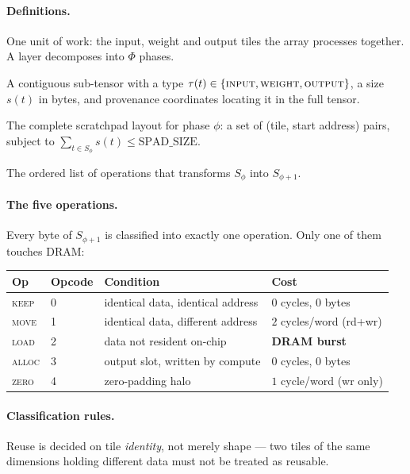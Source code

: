\documentclass[11pt,a4paper]{article}
\newcommand{\op}[1]{\textsc{#1}}
\begin{document}
\paragraph{Definitions.}
\begin{description}[leftmargin=1.8em,style=nextline,itemsep=3pt]
  \item[Phase $\phi$] One unit of work: the input, weight and output tiles the
        array processes together. A layer decomposes into $\Phi$ phases.
  \item[Tile $t$] A contiguous sub-tensor with a type
        $\tau(t) \in \{\textsc{input},\textsc{weight},\textsc{output}\}$, a
        size $s(t)$ in bytes, and provenance coordinates locating it in the
        full tensor.
  \item[Stamp $S_\phi$] The complete scratchpad layout for phase $\phi$: a set
        of (tile, start address) pairs, subject to
        $\sum_{t \in S_\phi} s(t) \le \text{SPAD\_SIZE}$.
  \item[Delta $\Delta_{\phi \to \phi+1}$] The ordered list of operations that
        transforms $S_\phi$ into $S_{\phi+1}$.
\end{description}

\paragraph{The five operations.} Every byte of $S_{\phi+1}$ is classified into
exactly one operation. Only one of them touches DRAM:

\begin{center}
\small
\begin{tabular}{@{}llll@{}}
\toprule
\textbf{Op} & \textbf{Opcode} & \textbf{Condition} & \textbf{Cost} \\
\midrule
\op{keep}  & 0 & identical data, identical address & 0 cycles, 0 bytes \\
\op{move}  & 1 & identical data, different address & $2$ cycles/word (rd+wr) \\
\op{load}  & 2 & data not resident on-chip         & \textbf{DRAM burst} \\
\op{alloc} & 3 & output slot, written by compute    & 0 cycles, 0 bytes \\
\op{zero}  & 4 & zero-padding halo                  & $1$ cycle/word (wr only) \\
\bottomrule
\end{tabular}
\end{center}

\paragraph{Classification rules.} Reuse is decided on tile \emph{identity},
not merely shape --- two tiles of the same dimensions holding different data
must not be treated as reusable.
\end{document}
